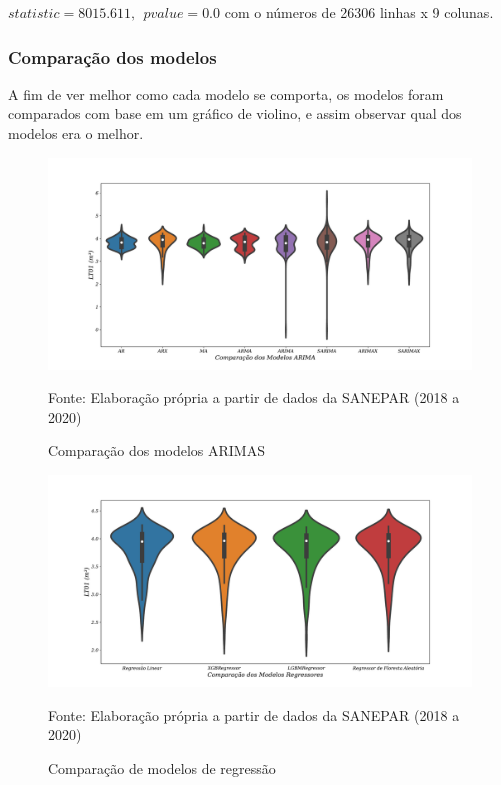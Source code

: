  
 $statistic=8015.611,\ \ pvalue=0.0$ com o números de 26306 linhas x 9 colunas.
 
 \subsubsection{Compara\c c\~ao dos modelos}
 
  A fim de ver melhor como cada modelo se comporta, os modelos foram comparados com base em um gráfico de violino, e assim observar qual dos modelos era o melhor.
 
 
 \begin{figure}[H]
 	\centering
 	\caption{Comparação dos modelos ARIMAS}
 	\includegraphics[width=0.9\linewidth]{Resultados/Figuras/modelos-arima}
 	
 	\label{fig:modelos-arima}
 	
 	Fonte: Elaboração própria a partir de dados da SANEPAR (2018 a 2020)
 \end{figure}
 
 
 \begin{figure}[H]
 	\centering
 	\caption{Comparação de modelos de regressão }
 	\includegraphics[width=0.9\linewidth]{Resultados/Figuras/violin-LR-XGB-LGBM-RF}
 	
 	\label{fig:violin-lr-xgb-lgbm-rf}
 	
 	Fonte: Elaboração própria a partir de dados da SANEPAR (2018 a 2020)
 \end{figure}

